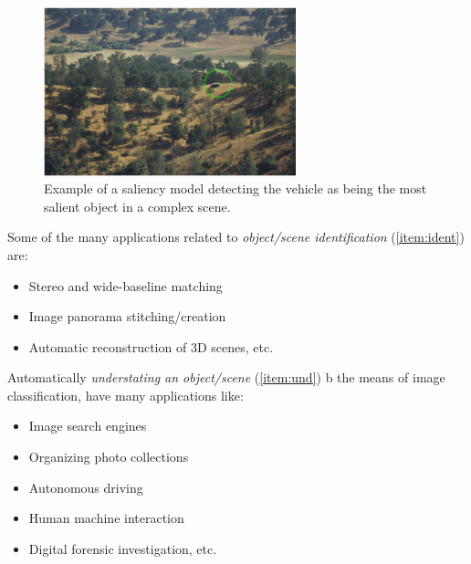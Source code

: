 \begin{figure}[H]
\begin{center}
\includegraphics[width=0.65\textwidth]{fig/saliency}
\end{center}
\caption{Example of a saliency model detecting the vehicle as being the most salient object in a complex scene.}
\label{fig:sal}
\end{figure}

Some of the many applications related to {\em object/scene identification} (\ref{item:ident}) are:
\begin{itemize}
\item Stereo and wide-baseline matching
\item Image panorama stitching/creation
\item Automatic reconstruction of 3D scenes, etc.
\end{itemize}

Automatically {\em understating an object/scene} (\ref{item:und}) b the means of image classification, have many applications like:
\begin{itemize}
\item Image search engines
\item Organizing photo collections
\item Autonomous driving
\item Human machine interaction
\item Digital forensic investigation, etc.
\end{itemize}

